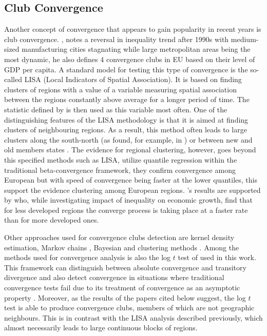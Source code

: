 \documentclass[11pt]{article}
\begin{document}
\subsection{Club Convergence} 
 Another concept of convergence that appears to gain popularity in recent years is club convergence. \citet{iammarino2017regional}, notes a reversal in inequality trend after 1990s with medium-sized manufacturing cities stagnating while large metropolitan areas being the most dynamic, he also defines 4 convergence clubs in EU based on their level of GDP per capita.
 A standard model for testing this type of convergence is the so-called LISA (Local Indicators of Spatial Association). It is based on finding clusters of regions with a value of a variable measuring spatial association between the regions constantly above average for a longer period of time. The statistic defined by \citet{getis1992analysis} is then used as this variable most often. One of the distinguishing features of the LISA methodology is that it is aimed at finding clusters of neighbouring regions. As a result, this method often leads to large clusters along the south-north  (as found, for example, in \citet{baumont2003spatial}) or between new and old members states \citep{eckey2007convergence}. The evidence for regional clustering, however, goes beyond this specified methods such as LISA, \citet{cartone2021does} utilize quantile regression within the traditional  beta-convergence framework, they confirm convergence among European but with speed of convergence being faster at the lower quantiles, this support the evidence clustering among European regions. \citeauthor{cartone2021does}'s results are supported by \citet{panzera2022impact} who, while investigating impact of inequality on economic growth, find that for less developed regions the converge process is taking place at a faster rate than for more developed ones.
 
Other approaches used for convergence clubs detection are kernel density estimation, Markov chains \citep{eckey2007convergence}, Bayesian \citep{fischer2015bayesian} and clustering methods \citep{maasoumi2008economic}. 
Among the methods used for convergence analysis is also the log $t$ test of \citet{phillips2007transition} used in this work. This framework can distinguish between absolute convergence and transitory divergence and also detect convergence in situations where traditional convergence tests fail due to its treatment of convergence as an asymptotic property \citep{bartkowska2012regional, borsi2015evolution}.
Moreover, as the results of the papers cited below suggest, the log $t$ test is able to produce convergence clubs, members of which are not geographic neighbours. This is in contrast with the LISA analysis described previously, which almost necessarily leads to large continuous blocks of regions.
\end{document}
